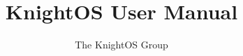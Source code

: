 \documentclass{book}
\begin{document}
\title{KnightOS User Manual}
\author{The KnightOS Group}
\maketitle
\tableofcontents





\end{document}
